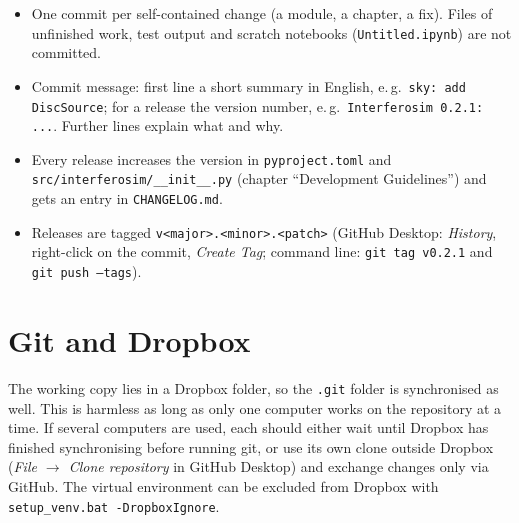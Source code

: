 \begin{itemize}
  \item One commit per self-contained change (a module, a chapter, a
        fix). Files of unfinished work, test output and scratch notebooks
        (\texttt{Untitled.ipynb}) are not committed.
  \item Commit message: first line a short summary in English, e.\,g.\
        \texttt{sky: add DiscSource}; for a release the version number,
        e.\,g.\ \texttt{Interferosim 0.2.1: ...}. Further lines explain
        what and why.
  \item Every release increases the version in \texttt{pyproject.toml}
        and \texttt{src/interferosim/\_\_init\_\_.py} (chapter
        \enquote{Development Guidelines}) and gets an entry in
        \texttt{CHANGELOG.md}.
  \item Releases are tagged \texttt{v<major>.<minor>.<patch>}
        (GitHub Desktop: \emph{History}, right-click on the commit,
        \emph{Create Tag}; command line: \texttt{git tag v0.2.1} and
        \texttt{git push --tags}).
\end{itemize}

\section{Git and Dropbox}

The working copy lies in a Dropbox folder, so the \texttt{.git} folder is
synchronised as well. This is harmless as long as only one computer
works on the repository at a time. If several computers are used, each
should either wait until Dropbox has finished synchronising before
running git, or use its own clone outside Dropbox (\emph{File
$\rightarrow$ Clone repository} in GitHub Desktop) and exchange changes
only via GitHub. The virtual environment can be excluded from Dropbox
with \texttt{setup\_venv.bat -DropboxIgnore}.
